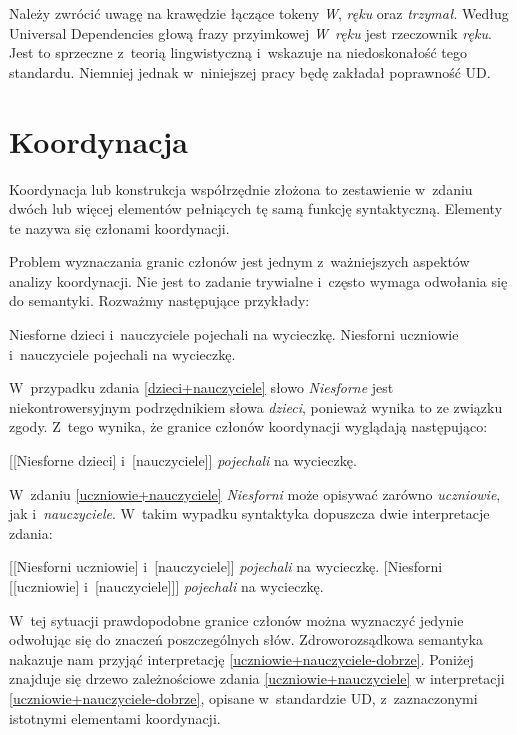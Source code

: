 Należy zwrócić uwagę na krawędzie łączące tokeny \emph{W}, \emph{ręku} oraz \emph{trzymał}. Według Universal Dependencies głową frazy przyimkowej \emph{W~ręku} jest rzeczownik \emph{ręku}. Jest to sprzeczne z~teorią lingwistyczną i~wskazuje na niedoskonałość tego standardu. Niemniej jednak w~niniejszej pracy będę zakładał poprawność UD.

\section{Koordynacja}

Koordynacja lub konstrukcja współrzędnie złożona to zestawienie w~zdaniu dwóch lub więcej elementów pełniących tę samą funkcję syntaktyczną. Elementy te nazywa się członami koordynacji.

Problem wyznaczania granic członów jest jednym z~ważniejszych aspektów analizy koordynacji. Nie jest to zadanie trywialne i~często wymaga odwołania się do semantyki. Rozważmy następujące przykłady:

\begin{exe}
\ex \label{dzieci+nauczyciele} Niesforne dzieci i~nauczyciele pojechali na wycieczkę.
\ex \label{uczniowie+nauczyciele} Niesforni uczniowie i~nauczyciele pojechali na wycieczkę.
\end{exe}

W~przypadku zdania \eqref{dzieci+nauczyciele} słowo \emph{Niesforne} jest niekontrowersyjnym podrzędnikiem słowa \emph{dzieci}, ponieważ wynika to ze związku zgody.  Z~tego wynika, że granice członów koordynacji wyglądają następująco:

\begin{exe}
\ex \label{dzieci+nauczyciele-nawiasy}
{[[Niesforne dzieci] i~[nauczyciele]] \emph{pojechali} na wycieczkę.}
\end{exe}

W~zdaniu \eqref{uczniowie+nauczyciele} \emph{Niesforni} może opisywać zarówno \emph{uczniowie}, jak i~\emph{nauczyciele}. W~takim wypadku syntaktyka dopuszcza dwie interpretacje zdania:

\begin{exe}
\ex \label{uczniowie+nauczyciele-dobrze}
{[[Niesforni uczniowie] i~[nauczyciele]] \emph{pojechali} na wycieczkę.}
\ex \label{uczniowie+nauczyciele-źle}
{[Niesforni [[uczniowie] i~[nauczyciele]]] \emph{pojechali} na wycieczkę.}
\end{exe}

W~tej sytuacji prawdopodobne granice członów można wyznaczyć jedynie odwołując się do znaczeń poszczególnych słów. Zdroworozsądkowa semantyka nakazuje nam przyjąć interpretację \eqref{uczniowie+nauczyciele-dobrze}. Poniżej znajduje się drzewo zależnościowe zdania \eqref{uczniowie+nauczyciele} w interpretacji \eqref{uczniowie+nauczyciele-dobrze}, opisane w~standardzie UD, z~zaznaczonymi istotnymi elementami koordynacji.

